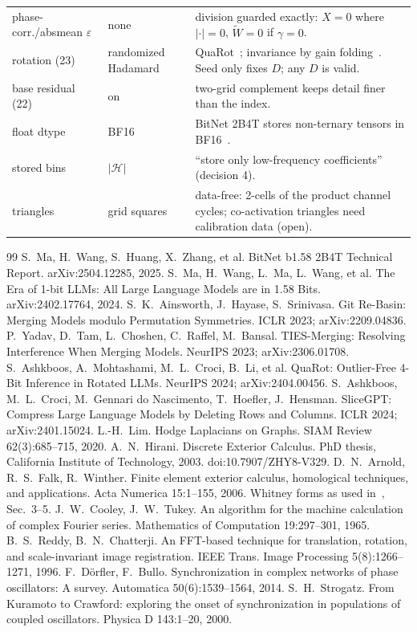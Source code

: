 \documentclass[11pt]{article}
\begin{document}
\begin{longtable}{p{3.2cm}p{2.6cm}p{9.2cm}}
phase-corr./absmean $\varepsilon$&none&division guarded exactly: $X=0$ where $|\cdot|=0$, $\widetilde W=0$ if $\gamma=0$.\\
rotation (23)&randomized Hadamard&QuaRot~\cite{quarot}; invariance by gain folding~\cite{slicegpt}. Seed only fixes $D$; any $D$ is valid.\\
base residual (22)&on&two-grid complement keeps detail finer than the index.\\
float dtype&BF16&BitNet 2B4T stores non-ternary tensors in BF16~\cite{bitnet2b4t}.\\
stored bins&$|\mathcal H|$&``store only low-frequency coefficients'' (decision 4).\\
triangles&grid squares&data-free: 2-cells of the product channel cycles; co-activation triangles need calibration data (open).\\\bottomrule
\end{longtable}

\begin{thebibliography}{99}
 S.~Ma, H.~Wang, S.~Huang, X.~Zhang, et al. BitNet b1.58 2B4T Technical Report. arXiv:2504.12285, 2025.
 S.~Ma, H.~Wang, L.~Ma, L.~Wang, et al. The Era of 1-bit LLMs: All Large Language Models are in 1.58 Bits. arXiv:2402.17764, 2024.
 S.~K.~Ainsworth, J.~Hayase, S.~Srinivasa. Git Re-Basin: Merging Models modulo Permutation Symmetries. ICLR 2023; arXiv:2209.04836.
 P.~Yadav, D.~Tam, L.~Choshen, C.~Raffel, M.~Bansal. TIES-Merging: Resolving Interference When Merging Models. NeurIPS 2023; arXiv:2306.01708.
 S.~Ashkboos, A.~Mohtashami, M.~L.~Croci, B.~Li, et al. QuaRot: Outlier-Free 4-Bit Inference in Rotated LLMs. NeurIPS 2024; arXiv:2404.00456.
 S.~Ashkboos, M.~L.~Croci, M.~Gennari do Nascimento, T.~Hoefler, J.~Hensman. SliceGPT: Compress Large Language Models by Deleting Rows and Columns. ICLR 2024; arXiv:2401.15024.
 L.-H.~Lim. Hodge Laplacians on Graphs. SIAM Review 62(3):685--715, 2020.
 A.~N.~Hirani. Discrete Exterior Calculus. PhD thesis, California Institute of Technology, 2003. doi:10.7907/ZHY8-V329.
 D.~N.~Arnold, R.~S.~Falk, R.~Winther. Finite element exterior calculus, homological techniques, and applications. Acta Numerica 15:1--155, 2006.
 Whitney forms as used in~\cite{afw}, Sec.~3--5.
 J.~W.~Cooley, J.~W.~Tukey. An algorithm for the machine calculation of complex Fourier series. Mathematics of Computation 19:297--301, 1965.
 B.~S.~Reddy, B.~N.~Chatterji. An FFT-based technique for translation, rotation, and scale-invariant image registration. IEEE Trans. Image Processing 5(8):1266--1271, 1996.
 F.~D\"orfler, F.~Bullo. Synchronization in complex networks of phase oscillators: A survey. Automatica 50(6):1539--1564, 2014.
 S.~H.~Strogatz. From Kuramoto to Crawford: exploring the onset of synchronization in populations of coupled oscillators. Physica D 143:1--20, 2000.
\end{thebibliography}
\end{document}
